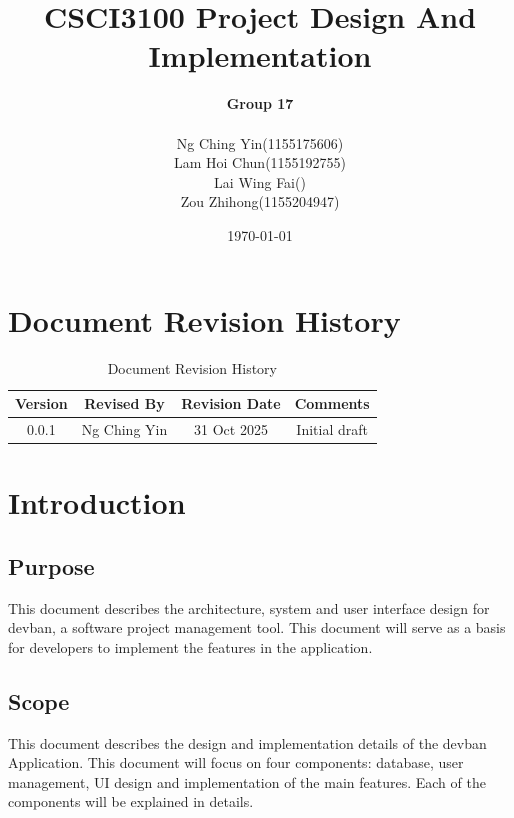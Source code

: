 \documentclass[11pt]{article}
\title{CSCI3100 Project Design And Implementation}
\author{
    \textbf{Group 17} \\[1em]
    \begin{tabular}{ll}
        Ng Ching Yin & (1155175606) \\
        Lam Hoi Chun & (1155192755) \\
        Lai Wing Fai & () \\
        Zou Zhihong & (1155204947)
    \end{tabular}
}
\date{\today}
\begin{document}
\maketitle

{
    \hypersetup{linkcolor=black}
    \tableofcontents
}

\newpage

\section{Document Revision History}
\begin{table}[h]
    \centering
    \caption{Document Revision History}
    \begin{tabular}{cccc}
        \toprule
        Version & Revised By & Revision Date & Comments \\
        \midrule
        0.0.1 & Ng Ching Yin & 31 Oct 2025 & Initial draft \\
        \bottomrule
    \end{tabular}
    \label{tab:docs_rev_hist}
\end{table}

\section{Introduction}

\subsection{Purpose}

This document describes the architecture, system and user interface design for devban, a
software project management tool. This document will serve as a basis for developers
to implement the features in the application.

\subsection{Scope}

This document describes the design and implementation details of the devban
Application. This document will focus on four components: 
database, user management, UI design and implementation of the main features. 
Each of the components will be explained in details.
\end{document}

